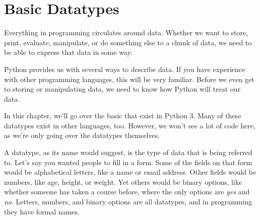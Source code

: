 \chapter{Basic Datatypes}
Everything in programming circulates around data. Whether we want to store, print, evaluate, manipulate, or do something else to a chunk of data, we need to be able to express that data in some way.\par
Python provides us with several ways to describe data. If you have experience with other programming languages, this will be very familiar. Before we even get to storing or manipulating data, we need to know how Python will treat our data.\par
In this chapter, we'll go over the basic  that exist in Python 3. Many of these datatypes exist in other languages, too. However, we won't see a lot of code here, as we're only going over the datatypes themselves.\par
A datatype, as its name would suggest, is the type of data that is being referred to. Let's say you wanted people to fill in a form. Some of the fields on that form would be alphabetical letters, like a name or email address. Other fields would be numbers, like age, height, or weight. Yet others would be binary options, like whether someone has taken a course before, where the only options are \textit{yes} and \textit{no}. Letters, numbers, and binary options are all datatypes, and in programming they have formal names.\par
{}
